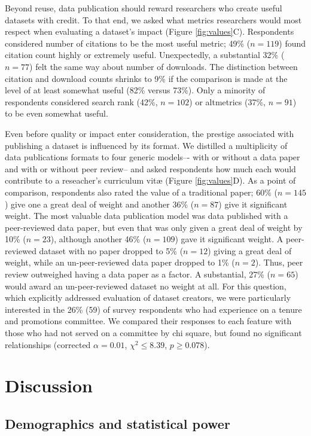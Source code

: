 \documentclass[10pt]{article}
\begin{document}
Beyond reuse, data publication should reward researchers who create useful datasets with credit.
To that end, we asked what metrics researchers would most respect when evaluating a dataset's impact (Figure \ref{fig:values}C).
Respondents considered number of citations to be the most useful metric; 49\% ($n=119$) found citation count highly or extremely useful. 
Unexpectedly, a substantial 32\% ($n=77$) felt the same way about number of downloads.
The distinction between citation and download counts shrinks to 9\% if the comparison is made at the level of at least somewhat useful (82\% versus 73\%).
Only a minority of respondents considered search rank (42\%, $n=102$) or altmetrics (37\%, $n=91$) to be even somewhat useful.

Even before quality or impact enter consideration, the prestige associated with publishing a dataset is influenced by its format.
We distilled a multiplicity of data publications formats to four generic models–- with or without a data paper and with or without peer review-- and asked respondents how much each would contribute to a reseacher's curriculum vit{\ae} (Figure \ref{fig:values}D).
As a point of comparison, respondents also rated the value of a traditional paper; 60\% ($n=145$) give one a great deal of weight and another 36\% ($n=87$) give it significant weight.
The most valuable data publication model was data published with a peer-reviewed data paper, but even that was only given a great deal of weight by 10\% ($n=23$), although another 46\% ($n=109$) gave it significant weight.
A peer-reviewed dataset with no paper dropped to 5\% ($n=12$) giving a great deal of weight, while an un-peer-reviewed data paper dropped to 1\% ($n=2$).
Thus, peer review outweighed having a data paper as a factor. 
A substantial, 27\% ($n=65$) would award an un-peer-reviewed dataset no weight at all.
For this question, which explicitly addressed evaluation of dataset creators, we were particularly interested in the 26\% (59) of survey respondents who had experience on a tenure and promotions committee.
We compared their responses to each feature with those who had not served on a committee by chi square, but found no significant relationships (corrected $\alpha= 0.01$, $\chi^{2}\leq 8.39$, $p\geq 0.078$).
\section*{Discussion}

\subsection*{Demographics and statistical power}
\end{document}
